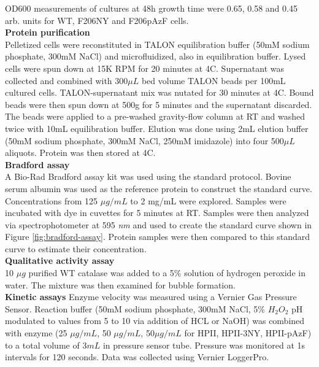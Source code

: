 \documentclass[journal=jacsat,manuscript=article]{achemso}
\begin{document}
OD600 measurements of cultures at 48h growth time were 0.65, 0.58 and 0.45 arb. units for WT, F206NY and F206pAzF cells.\\

\textbf{Protein purification}\\
Pelletized cells were reconstituted in TALON equilibration buffer (50mM sodium phosphate, 300mM NaCl) and microfluidized, also in equilibration buffer. Lysed cells were spun down at 15K RPM for 20 minutes at 4C. Supernatant was collected and combined with 300$\mu L$ bed volume TALON beads per 100mL cultured cells. TALON-supernatant mix was nutated for 30 minutes at 4C. Bound beads were then spun down at 500g for 5 minutes and the supernatant discarded. The beads were applied to a pre-washed gravity-flow column at RT and washed twice with 10mL equilibration buffer. Elution was done using 2mL elution buffer (50mM sodium phosphate, 300mM NaCl, 250mM imidazole) into four 500$\mu L$ aliquots. Protein was then stored at 4C.\\

\textbf{Bradford assay}\\
A Bio-Rad Bradford assay kit was used using the standard protocol. Bovine serum albumin was used as the reference protein to construct the standard curve. Concentrations from 125 $\mu g / mL$ to 2 mg/mL were explored. Samples were incubated with dye in cuvettes for 5 minutes at RT. Samples were then analyzed via spectrophotometer at 595 \textit{nm} and used to create the standard curve shown in Figure \ref{fig:bradford-assay}. Protein samples were then compared to this standard curve to estimate their concentration.\\

\textbf{Qualitative activity assay}\\
10 $\mu g$ purified WT catalase was added to a 5\% solution of hydrogen peroxide in water. The mixture was then examined for bubble formation.\\

\textbf{Kinetic assays}
Enzyme velocity was measured using a Vernier Gas Pressure Sensor. Reaction buffer (50mM sodium phosphate, 300mM NaCl, 5\% $H_2O_2$ pH modulated to values from 5 to 10 via addition of HCL or NaOH) was combined with enzyme (25 $\mu g/mL$, 50 $\mu g/mL$, 50$\mu g/mL$ for HPII, HPII-3NY, HPII-pAzF) to a total volume of $3mL$ in pressure sensor tube. Pressure was monitored at 1s intervals for 120 seconds. Data was collected using Vernier LoggerPro.\\
\end{document}
